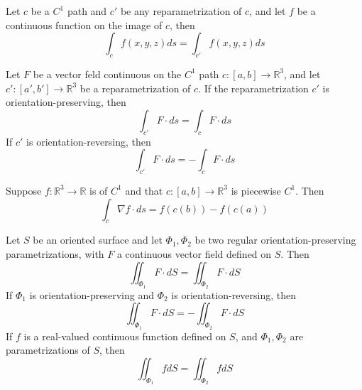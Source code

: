 \documentclass[openany]{book}
\newcommand{\R}{\mathbb{R}}
\begin{document}
\begin{prop}
    Let $c$ be a $C^1$ path and $c'$ be any reparametrization of $c$, and let $f$ be a continuous function on the image of $c$, then 
    \begin{equation*}
        \int_cf(x,y,z)ds=\int_{c'}f(x,y,z)ds
    \end{equation*}
\end{prop}

\begin{prop}
    Let $F$ be a vector feld continuous on the $C^1$ path $c:[a,b]\to\R^3$, and let $c':[a',b']\to\R^3$ be a reparametrization of $c$. If the reparametrization $c'$ is orientation-preserving, then 
    \begin{equation*}
        \int_{c'}F\cdot ds=\int_c F\cdot ds
    \end{equation*}
    If $c'$ is orientation-reversing, then 
    \begin{equation*}
        \int_{c'}F\cdot ds=-\int_cF\cdot ds
    \end{equation*}
\end{prop}

\begin{prop}
    Suppose $f:\R^3\to\R$ is of $C^1$ and that $c:[a,b]\to\R^3$ is piecewise $C^1$. Then 
    \begin{equation*}
        \int_c\nabla f\cdot ds=f(c(b))-f(c(a))
    \end{equation*}
\end{prop}


\begin{prop}
    Let $S$ be an oriented surface and let $\Phi_1, \Phi_2$ be two regular orientation-preserving parametrizations, with $F$ a continuous vector field defined on $S$. Then 
    \begin{equation*}
        \iint_{\Phi_1}F\cdot dS=\iint_{\Phi_2}F\cdot dS
    \end{equation*}
    If $\Phi_1$ is orientation-preserving and $\Phi_2$ is orientation-reversing, then 
    \begin{equation*}
        \iint_{\Phi_1}F\cdot dS=-\iint_{\Phi_2}F\cdot dS
    \end{equation*}
    If $f$ is a real-valued continuous function defined on $S$, and $\Phi_1, \Phi_2$ are parametrizations of $S$, then 
    \begin{equation*}
        \iint_{\Phi_1}fdS=\iint_{\Phi_2}fdS
    \end{equation*}
\end{prop}
\end{document}
